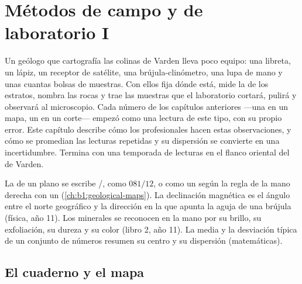 \chapter{Métodos de campo y de laboratorio I}\label{ch:b1:field-lab-methods-1}

Un geólogo que cartografía las colinas de Varden lleva poco equipo: una libreta, un lápiz, un
receptor de satélite, una brújula-clinómetro, una lupa de mano y unas cuantas bolsas de muestras.
Con ellos fija dónde está, mide la  de los estratos, nombra las rocas y trae las muestras que
el laboratorio cortará, pulirá y observará al microscopio. Cada número de los capítulos anteriores ---una
 en un mapa, un  en un corte--- empezó como una lectura de este tipo, con su propio
error. Este capítulo describe cómo los profesionales hacen estas observaciones, y cómo se promedian las
lecturas repetidas y su dispersión se convierte en una incertidumbre. Termina con una temporada de
lecturas en el flanco oriental del  de Varden.

\begin{recall}
La  de un plano se escribe /, como $081/12$, o como un 
según la regla de la mano derecha con un  (\cref{ch:b1:geological-maps}). La declinación
magnética es el ángulo entre el norte geográfico y la dirección en la que apunta la aguja de una
brújula (física, año 11). Los minerales se reconocen en la mano por su brillo, su exfoliación, su
dureza y su color (libro 2, año 11). La media y la desviación típica de un conjunto de números resumen
su centro y su dispersión (matemáticas).
\end{recall}

\section{El cuaderno y el mapa}

